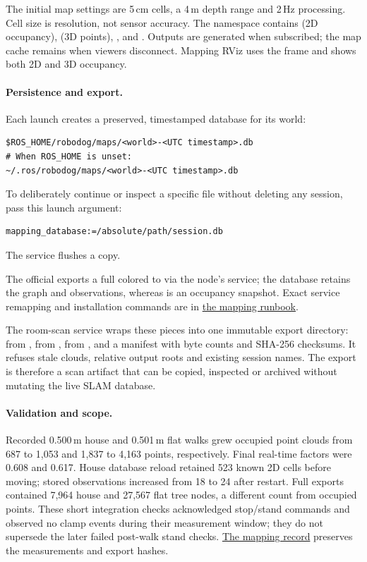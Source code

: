 \documentclass[11pt,a4paper]{article}
\begin{document}
The initial map settings are 5\,cm cells, a 4\,m depth range and 2\,Hz
processing. Cell size is resolution, not sensor accuracy. The namespace
 contains  (2D occupancy),
 (3D points), ,
 and . Outputs are generated when
subscribed; the map cache remains when viewers disconnect. Mapping RViz uses
the  frame and shows both 2D and 3D occupancy.

\paragraph{Persistence and export.} Each launch creates a preserved,
timestamped database for its world:
\begin{lstlisting}
$ROS_HOME/robodog/maps/<world>-<UTC timestamp>.db
# When ROS_HOME is unset:
~/.ros/robodog/maps/<world>-<UTC timestamp>.db
\end{lstlisting}
To deliberately continue or inspect a specific file without deleting any
session, pass this launch argument:
\begin{lstlisting}
mapping_database:=/absolute/path/session.db
\end{lstlisting}
The  service flushes a  copy.

The official  exports a full colored
 to  via the node's  service;
the database retains the graph and observations, whereas  is an
occupancy snapshot. Exact service remapping and installation commands are in
\href{mapping.md}{the mapping runbook}.

The room-scan service wraps these pieces into one immutable export directory:
 from ,
 from
,
 from
, and a manifest with byte counts
and SHA-256 checksums. It refuses stale clouds, relative output roots and
existing session names. The export is therefore a scan artifact that can be
copied, inspected or archived without mutating the live SLAM database.

\paragraph{Validation and scope.} Recorded 0.500\,m house and 0.501\,m flat
walks grew occupied point clouds from 687 to 1,053 and 1,837 to 4,163 points,
respectively. Final real-time factors were 0.608 and 0.617. House database
reload retained 523 known 2D cells before moving; stored observations increased
from 18 to 24 after restart. Full exports contained 7,964 house and 27,567 flat
tree nodes, a different count from occupied points. These short integration
checks acknowledged stop/stand commands and observed no clamp events during
their measurement window; they do not supersede the later failed post-walk
stand checks. \href{mapping_validation.json}{The mapping record} preserves
the measurements and export hashes.
\end{document}
